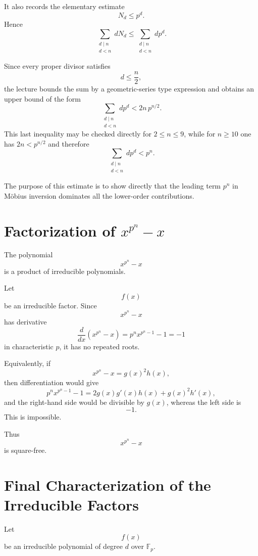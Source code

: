 \documentclass[11pt]{article}
\theoremstyle{remark}
\newcommand{\Fp}{\mathbb F_p}
\begin{document}
It also records the elementary estimate
\[
    N_d\le p^d.
\]
Hence
\[
    \sum_{\substack{d\mid n\\d<n}}dN_d
    \le
    \sum_{\substack{d\mid n\\d<n}}dp^d.
\]

Since every proper divisor satisfies
\[
    d\le\frac n2,
\]
the lecture bounds the sum by a geometric-series type expression and
obtains an upper bound of the form
\[
    \sum_{\substack{d\mid n\\d<n}}dp^d
    <
    2n\,p^{n/2}.
\]
This last inequality may be checked directly for $2\le n\le 9$, while for
$n\ge 10$ one has $2n<p^{n/2}$ and therefore
\[
    \sum_{\substack{d\mid n\\d<n}}dp^d
    <p^n.
\]

The purpose of this estimate is to show directly that the leading term
$p^n$ in Möbius inversion dominates all the lower-order contributions.

\section{Factorization of $x^{p^n}-x$}

The polynomial
\[
    x^{p^n}-x
\]
is a product of irreducible polynomials.

Let
\[
    f(x)
\]
be an irreducible factor. Since
\[
    x^{p^n}-x
\]
has derivative
\[
    \frac{d}{dx}(x^{p^n}-x)
    =
    p^n x^{p^n-1}-1
    =
    -1
\]
in characteristic $p$, it has no repeated roots.

Equivalently, if
\[
    x^{p^n}-x=g(x)^2h(x),
\]
then differentiation would give
\[
    p^n x^{p^n-1}-1
    =
    2g(x)g'(x)h(x)+g(x)^2h'(x),
\]
and the right-hand side would be divisible by $g(x)$, whereas the left
side is
\[
    -1.
\]
This is impossible.

Thus
\[
    x^{p^n}-x
\]
is square-free.

\section{Final Characterization of the Irreducible Factors}

Let
\[
    f(x)
\]
be an irreducible polynomial of degree $d$ over $\Fp$.
\end{document}
